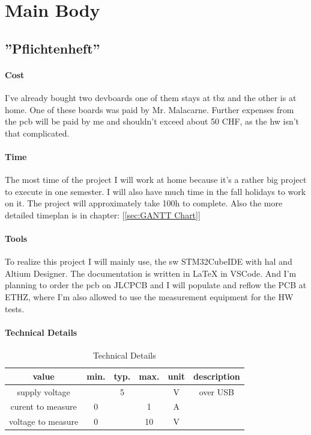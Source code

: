 \chapter{Main Body}
\label{cha:Main Body}


\section{''Pflichtenheft''}
\label{sec:Pflichtenheft}

\subsubsection{Cost}
I've already bought two \acs{devboard}s one of them stays at \acs{tbz} and the other is at home. One of these boards was paid by Mr. Malacarne. Further expenses from the \acs{pcb} will be paid by me and shouldn't exceed about 50 CHF, as the \acs{hw} isn't that complicated.

\subsubsection{Time}
The most time of the project I will work at home because it's a rather big project to execute in one semester. I will also have much time in the fall holidays to work on it. The project will approximately take 100h to complete. Also the more detailed timeplan is in chapter: [\ref{sec:GANTT Chart}]

\subsubsection{Tools}
To realize this project I will mainly use, the \acs{sw} STM32CubeIDE with \acs{hal} and Altium Designer. The documentation is written in LaTeX in VSCode. And I'm planning to order the \acs{pcb} on JLCPCB and I will populate and reflow the PCB at ETHZ, where I'm also allowed to use the measurement equipment for the HW tests.

\subsubsection{Technical Details}
\begin{table}[H]
    \centering
    \label{tab:Technical Details}
\begin{tabular}{||c || c | c | c | c  || c ||} 
 \hline
 value &  min. & typ. & max. & unit & description \\ [0.5ex] 
 \hline\hline
  supply voltage & & 5 & & V & over USB \\ 
 \hline
 curent to measure & 0 & & 1 & A & \\ 
 \hline
 voltage to measure & 0 & & 10 & V & \\ 
 \hline
\end{tabular}
    \caption{Technical Details}
\end{table}

